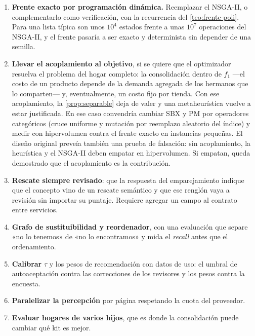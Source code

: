 \begin{enumerate}
  \item \textbf{Frente exacto por programación dinámica.} Reemplazar el
        NSGA-II, o complementarlo como verificación, con la recurrencia del
        \cref{teo:frente-poli}. Para una lista típica son unos $10^4$ estados
        frente a unas $10^7$ operaciones del NSGA-II, y el frente pasaría a ser
        exacto y determinista sin depender de una semilla.
  \item \textbf{Llevar el acoplamiento al objetivo}, si se quiere que el
        optimizador resuelva el problema del hogar completo: la consolidación
        dentro de $f_1$ ---el costo de un producto depende de la demanda
        agregada de los hermanos que lo comparten--- y, eventualmente, un costo
        fijo por tienda. Con ese acoplamiento, la \cref{prop:separable} deja de
        valer y una metaheurística vuelve a estar justificada. En ese caso
        convendría cambiar SBX y PM por operadores categóricos (cruce uniforme
        y mutación por reemplazo aleatorio del índice) y medir con
        hipervolumen \cite{zitzler1999} contra el frente exacto en instancias
        pequeñas. El diseño original preveía también una prueba de falsación:
        sin acoplamiento, la heurística y el NSGA-II deben empatar en
        hipervolumen. Si empatan, queda demostrado que el acoplamiento es la
        contribución.
  \item \textbf{Rescate siempre revisado}: que la respuesta del emparejamiento
        indique que el concepto vino de un rescate semántico y que ese renglón
        vaya a revisión sin importar su puntaje. Requiere agregar un campo al
        contrato entre servicios.
  \item \textbf{Grafo de sustituibilidad y reordenador}, con una evaluación
        que separe «no lo tenemos» de «no lo encontramos» y mida el
        \emph{recall} antes que el ordenamiento.
  \item \textbf{Calibrar} $\tau$ y los pesos de recomendación con datos de uso:
        el umbral de autoaceptación contra las correcciones de los revisores y
        los pesos contra la encuesta.
  \item \textbf{Paralelizar la percepción} por página respetando la cuota del
        proveedor.
  \item \textbf{Evaluar hogares de varios hijos}, que es donde la
        consolidación puede cambiar qué kit es mejor.
\end{enumerate}

